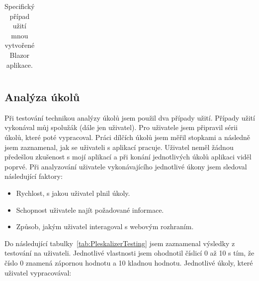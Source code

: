 \begin{center}
\begin{table}[ht]
\begin{tabular}{| p{0.02\linewidth} | p{0.93\linewidth} |}
    \end{tabular}
    \caption{Specifický případ užití mnou vytvořené Blazor aplikace.}
    \label{tab:PleskalizerSpecialUseCase}
\end{table}
\end{center}

        \subsection{Analýza úkolů}
        Při testování technikou analýzy úkolů jsem použil dva případy užití. Případy užití vykonával můj spolužák (dále jen uživatel). Pro uživatele jsem připravil sérii úkolů, které poté vypracoval. Práci dílčích úkolů jsem měřil stopkami a následně jsem zaznamenal, jak se uživateli s aplikací pracuje. Uživatel neměl žádnou předešlou zkušenost s mojí aplikací a při konání jednotlivých úkolů aplikaci viděl poprvé. Při analyzování uživatele vykonávajícího jednotlivé úkony jsem sledoval následující faktory:
        \begin{itemize}
            \item Rychlost, s jakou uživatel plnil úkoly.
            \item Schopnost uživatele najít požadované informace.
            \item Způsob, jakým uživatel interagoval s webovým rozhraním.
        \end{itemize}
        Do následující tabulky~\ref{tab:PleskalizerTesting} jsem zaznamenal výsledky z testování na uživateli. Jednotlivé vlastnosti jsem ohodnotil číslicí 0 až 10 s tím, že číslo 0 znamená zápornou hodnotu a 10 kladnou hodnotu. Jednotlivé úkoly, které uživatel vypracovával:
